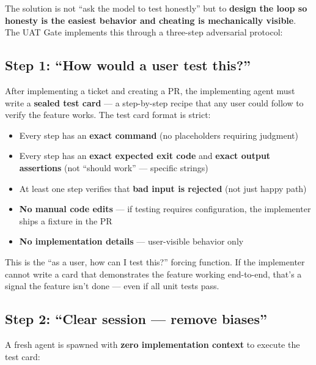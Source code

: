 \documentclass[11pt,a4paper]{article}
\providecommand{\tightlist}{%
  \setlength{\itemsep}{0pt}\setlength{\parskip}{0pt}}
\begin{document}
The solution is not ``ask the model to test honestly'' but to \textbf{design the loop so honesty is the easiest behavior and cheating is mechanically visible}. The UAT Gate implements this through a three-step adversarial protocol:

\subsection{Step 1: ``How would a user test this?''}\label{sec:step-1-how-would-a-user-test-this}

After implementing a ticket and creating a PR, the implementing agent must write a \textbf{sealed test card} --- a step-by-step recipe that any user could follow to verify the feature works. The test card format is strict:

\begin{itemize}
\tightlist
\item
  Every step has an \textbf{exact command} (no placeholders requiring judgment)
\item
  Every step has an \textbf{exact expected exit code} and \textbf{exact output assertions} (not ``should work'' --- specific strings)
\item
  At least one step verifies that \textbf{bad input is rejected} (not just happy path)
\item
  \textbf{No manual code edits} --- if testing requires configuration, the implementer ships a fixture in the PR
\item
  \textbf{No implementation details} --- user-visible behavior only
\end{itemize}

This is the ``as a user, how can I test this?'' forcing function. If the implementer cannot write a card that demonstrates the feature working end-to-end, that's a signal the feature isn't done --- even if all unit tests pass.

\subsection{Step 2: ``Clear session --- remove biases''}\label{sec:step-2-clear-session-remove-biases}

A fresh agent is spawned with \textbf{zero implementation context} to execute the test card:
\end{document}

